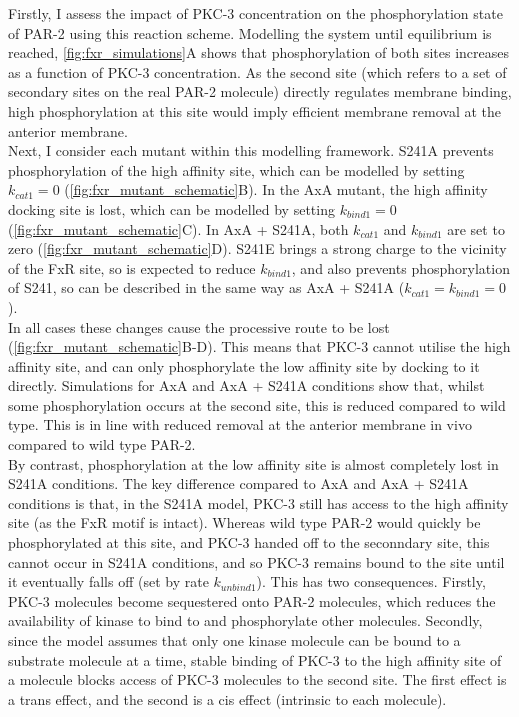 \documentclass[12pt]{"report"}
\begin{document}
Firstly, I assess the impact of PKC-3 concentration on the phosphorylation state of PAR-2 using this reaction scheme. Modelling the system until equilibrium is reached, \cref{fig:fxr_simulations}A shows that phosphorylation of both sites increases as a function of PKC-3 concentration. As the second site (which refers to a set of secondary sites on the real PAR-2 molecule) directly regulates membrane binding, high phosphorylation at this site would imply efficient membrane removal at the anterior membrane.\\

Next, I consider each mutant within this modelling framework. S241A prevents phosphorylation of the high affinity site, which can be modelled by setting $k_{cat1} = 0$ (\cref{fig:fxr_mutant_schematic}B). In the AxA mutant, the high affinity docking site is lost, which can be modelled by setting $k_{bind1} = 0$ (\cref{fig:fxr_mutant_schematic}C). In AxA + S241A, both $k_{cat1}$ and $k_{bind1}$ are set to zero (\cref{fig:fxr_mutant_schematic}D). S241E brings a strong charge to the vicinity of the FxR site, so is expected to reduce $k_{bind1}$, and also prevents phosphorylation of S241, so can be described in the same way as AxA + S241A ($k_{cat1} = k_{bind1} = 0$).\\

In all cases these changes cause the processive route to be lost (\cref{fig:fxr_mutant_schematic}B-D). This means that PKC-3 cannot utilise the high affinity site, and can only phosphorylate the low affinity site by docking to it directly. Simulations for AxA and AxA + S241A conditions show that, whilst some phosphorylation occurs at the second site, this is reduced compared to wild type. This is in line with reduced removal at the anterior membrane in vivo compared to wild type PAR-2.\\

By contrast, phosphorylation at the low affinity site is almost completely lost in S241A conditions. The key difference compared to AxA and AxA + S241A conditions is that, in the S241A model, PKC-3 still has access to the high affinity site (as the FxR motif is intact). Whereas wild type PAR-2 would quickly be phosphorylated at this site, and PKC-3 handed off to the seconndary site, this cannot occur in S241A conditions, and so PKC-3 remains bound to the site until it eventually falls off (set by rate $k_{unbind1}$). This has two consequences. Firstly, PKC-3 molecules become sequestered onto PAR-2 molecules, which reduces the availability of kinase to bind to and phosphorylate other molecules. Secondly, since the model assumes that only one kinase molecule can be bound to a substrate molecule at a time, stable binding of PKC-3 to the high affinity site of a molecule blocks access of PKC-3 molecules to the second site. The first effect is a trans effect, and the second is a cis effect (intrinsic to each molecule).\\
\end{document}
